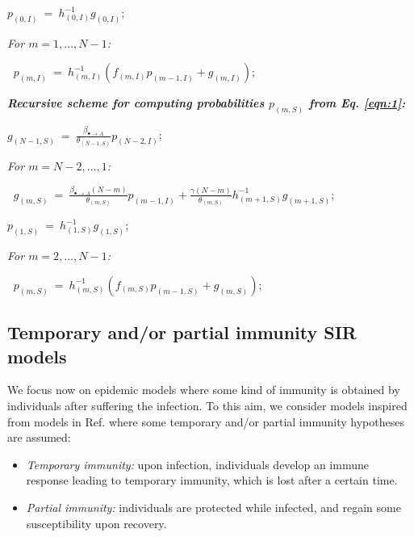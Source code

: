 \documentclass[preprint,12pt]{elsarticle}
\begin{document}
\begin{description}
  \item $p_{(0,I)} ~=~ h_{(0,I)}^{-1}g_{(0,I)}$;
  \item \it For $m=1,\dots,N-1$:
  \item $~$\hspace{0.5cm} $p_{(m,I)} ~=~ h_{(m,I)}^{-1}\left(f_{(m,I)}p_{(m-1,I)}+g_{(m,I)}\right)$;
  \item \textit{\textbf{Recursive scheme for computing probabilities $p_{(m,S)}$ from Eq. \eqref{eqn:1}:}}
  \item $g_{(N-1,S)} ~=~ \frac{\beta_{\bullet\rightarrow A}}{\theta_{(N-1,S)}}p_{(N-2,I)}$;
  \item \it For $m=N-2,\dots,1$:
  \item $~$\hspace{0.5cm} $g_{(m,S)} ~=~ \frac{\beta_{\bullet\rightarrow A}(N-m)}{\theta_{(m,S)}}p_{(m-1,I)}+\frac{\gamma(N-m)}{\theta_{(m,S)}}h_{(m+1,S)}^{-1}g_{(m+1,S)}$;
  \item $p_{(1,S)} ~=~ h_{(1,S)}^{-1}g_{(1,S)}$;
  \item \it For $m=2,\dots,N-1$:
  \item $~$\hspace{0.5cm} $p_{(m,S)} ~=~ h_{(m,S)}^{-1}\left(f_{(m,S)}p_{(m-1,S)}+g_{(m,S)}\right)$;
\end{description}

\subsection{Temporary and/or partial immunity SIR models}
\label{SubSect22}

\par We focus now on epidemic models where some kind of immunity is obtained by individuals after suffering the infection. To this aim, we consider models inspired from models in
Ref. \cite{gomes2004infection} where some temporary and/or partial immunity hypotheses are assumed:
\begin{itemize}
 \item {\it Temporary immunity:} upon infection, individuals develop an immune response leading to temporary immunity, which is lost after a certain
time.
  \item {\it Partial immunity:} individuals are protected while infected, and regain some susceptibility upon recovery.
\end{itemize}
\end{document}
